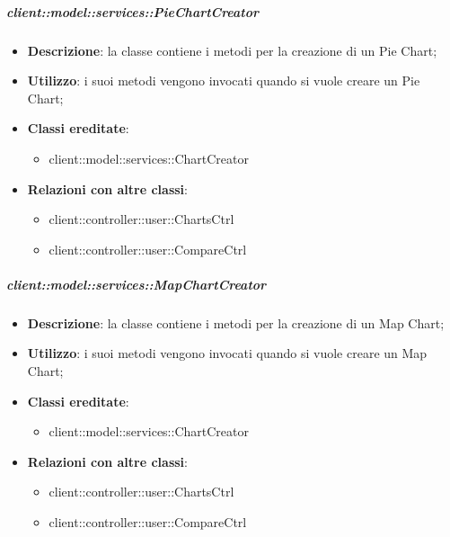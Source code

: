 		\subparagraph{client::model::services::PieChartCreator} %
		\label{subp:piechartcreator}
			\begin{itemize}
				\item \textbf{Descrizione}: la classe contiene i metodi per la creazione di un Pie Chart;
				\item \textbf{Utilizzo}: i suoi metodi vengono invocati quando si vuole creare un Pie Chart;
				\item \textbf{Classi ereditate}:
					\begin{itemize}
						\item client::model::services::ChartCreator
					\end{itemize}
				\item \textbf{Relazioni con altre classi}:
					\begin{itemize}
						\item client::controller::user::ChartsCtrl
						\item client::controller::user::CompareCtrl
					\end{itemize}
			\end{itemize}

		\subparagraph{client::model::services::MapChartCreator} %
		\label{subp:mapchartcreator}
			\begin{itemize}
				\item \textbf{Descrizione}: la classe contiene i metodi per la creazione di un Map Chart;
				\item \textbf{Utilizzo}: i suoi metodi vengono invocati quando si vuole creare un Map Chart;
				\item \textbf{Classi ereditate}:
					\begin{itemize}
						\item client::model::services::ChartCreator
					\end{itemize}
				\item \textbf{Relazioni con altre classi}:
					\begin{itemize}
						\item client::controller::user::ChartsCtrl
						\item client::controller::user::CompareCtrl
					\end{itemize}
			\end{itemize}

